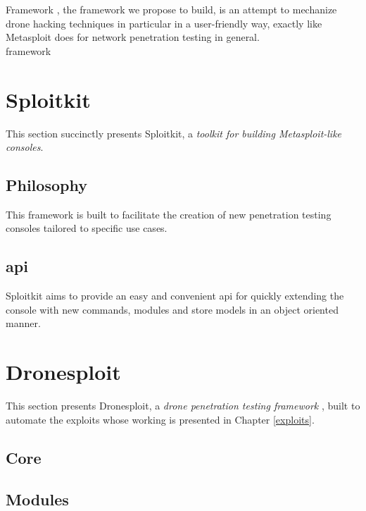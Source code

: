 \begin{chaptercover}{Framework}%
{
{\large \hyphenation{} , the framework we propose to build, is an attempt to mechanize drone hacking techniques in particular in a user-friendly way, exactly like Metasploit does for network penetration testing in general. \newline\\}}%
{framework}

\section{Sploitkit}

This section succinctly presents Sploitkit, a \textit{toolkit for building Metasploit-like consoles}. \cite{sploitkit}

\subsection{Philosophy}

This framework is built to facilitate the creation of new penetration testing consoles tailored to specific use cases.

\subsection{\acrlong{api}}

Sploitkit aims to provide an easy and convenient \acrshort{api} for quickly extending the console with new commands, modules and store models in an object oriented manner.


\section{Dronesploit}

This section presents Dronesploit, a \textit{drone penetration testing framework} \cite{dronesploit}, built to automate the exploits whose working is presented in Chapter \ref{exploits}.

\subsection{Core}


\subsection{Modules}



\end{chaptercover}
